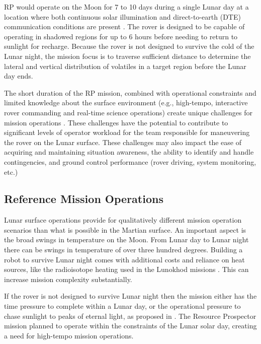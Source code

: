 \documentclass[twocolumn,letterpaper]{IEEEAerospaceCLS}  %
\begin{document}
RP would operate on the Moon for 7 to 10 days during a single Lunar day at a location where both continuous solar illumination and direct-to-earth (DTE) communication conditions are present \cite{trimble2016lunar}. 
The rover is designed to be capable of operating in shadowed regions for up to 6 hours before needing to return to sunlight for recharge. 
Because the rover is not designed to survive the cold of the Lunar night, the mission focus is to traverse sufficient distance to determine the lateral and vertical distribution of volatiles in a target region before the Lunar day ends.

The short duration of the RP mission, combined with operational constraints and limited knowledge about the surface environment (e.g., high-tempo, interactive rover commanding and real-time science operations) create unique challenges for mission operations \cite{hooey2017modeling}. 
These challenges have the potential to contribute to significant levels of operator workload for the team responsible for maneuvering the rover on the Lunar surface. 
These challenges may also impact the ease of acquiring and maintaining situation awareness, the ability to identify and handle contingencies, and ground control performance (rover driving, system monitoring, etc.)

\subsection{Reference Mission Operations}
Lunar surface operations provide for qualitatively different mission operation scenarios than what is possible in the Martian surface.
An important aspect is the broad swings in temperature on the Moon.  
From Lunar day to Lunar night there can be swings in temperature of over three hundred degrees.  
Building a robot to survive Lunar night comes with additional costs and reliance on heat sources, like the radioisotope heating used in the Lunokhod missions \cite{ulamec2010survive}.
This can increase mission complexity substantially.  

If the rover is not designed to survive Lunar night then the mission either has the time pressure to complete within a Lunar day, or the operational pressure to chase sunlight to peaks of eternal light, as proposed in \cite{otten2018strategic}.
The Resource Prospector mission planned to operate within the constraints of the Lunar solar day, creating a need for high-tempo mission operations. 
\end{document}
